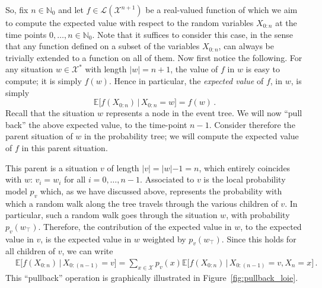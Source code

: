 \documentclass[graybox]{svmult}
\newcommand{\nats}{\mathbb{N}}
\newcommand{\natswith}{\nats_{0}}
\newcommand{\states}{\mathcal{X}}
\newcommand{\gambles}{\mathcal{L}}
\begin{document}
So, fix $n\in\natswith$ and let $f\in\gambles(\states^{n+1})$ be a real-valued function of which we aim to compute the expected value with respect to the random variables $X_{0:n}$ at the time points $0,\ldots,n\in\natswith$. Note that it suffices to consider this case, in the sense that any function defined on a subset of the variables $X_{0:n}$, can always be trivially extended to a function on all of them. Now first notice the following. For any situation $w\in\states^*$ with length $\lvert w\rvert = n+1$, the value of $f$ in $w$ is easy to compute; it is simply $f(w)$. Hence in particular, the \emph{expected value} of $f$, in $w$, is simply
\begin{equation*}
\mathbb{E}\bigl[f(X_{0:n})\,\big\vert\,X_{0:n}=w\bigr] = f(w)\,.
\end{equation*}
Recall that the situation $w$ represents a node in the event tree. We will now ``pull back'' the above expected value, to the time-point $n-1$. Consider therefore the parent situation of $w$ in the probability tree; we will compute the expected value of $f$ in this parent situation.

This parent is a situation $v$ of length $\lvert v\lvert=\lvert w\lvert-1=n$, which entirely coincides with $w$: $v_i=w_i$ for all $i=0,\ldots,n-1$. Associated to $v$ is the local probability model $p_v$ which, as we have discussed above, represents the probability with which a random walk along the tree travels through the various children of $v$. In particular, such a random walk goes through the situation $w$, with probability $p_v(w_\top)$. Therefore, the contribution of the expected value in $w$, to the expected value in $v$, is the expected value in $w$ weighted by $p_v(w_\top)$. Since this holds for all children of $v$, we can write
\begin{align*}
&\mathbb{E}\bigl[f(X_{0:n}) \,\big\vert\, X_{0:(n-1)}=v \bigr] = \sum_{x\in\states} p_v(x)\mathbb{E}\bigl[f(X_{0:n})\,\big\vert\,X_{0:(n-1)}=v,X_n=x\bigr]\,.
\end{align*}
This ``pullback'' operation is graphically illustrated in Figure~\ref{fig:pullback_loie}.
\end{document}
